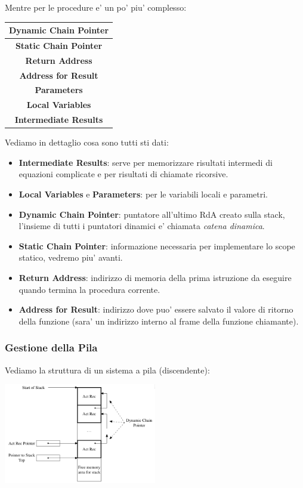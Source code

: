 Mentre per le procedure e' un po' piu' complesso:
\begin{center}
    \renewcommand{\arraystretch}{1.8} %
    \setlength{\tabcolsep}{2em} %
    
    \begin{tabular}{|c|}
        \hline
        \textbf{Dynamic Chain Pointer} \\ \hline
        \textbf{Static Chain Pointer} \\ \hline
        \textbf{Return Address} \\ \hline
        \textbf{Address for Result} \\ \hline
        \textbf{Parameters} \\ \hline
        \textbf{Local Variables} \\ \hline
        \textbf{Intermediate Results} \\ \hline
    \end{tabular}
\end{center}

Vediamo in dettaglio cosa sono tutti sti dati:
\begin{itemize}
\item \textbf{Intermediate Results}: serve per memorizzare risultati intermedi di equazioni complicate e per risultati di chiamate ricorsive.
\item \textbf{Local Variables} e \textbf{Parameters}: per le variabili locali e parametri.
\item \textbf{Dynamic Chain Pointer}: puntatore all'ultimo RdA creato sulla stack, l'insieme di tutti i puntatori dinamici e' chiamata \textit{catena dinamica}.
\item \textbf{Static Chain Pointer}: informazione necessaria per implementare lo scope statico, vedremo piu' avanti.
\item \textbf{Return Address}: indirizzo di memoria della prima istruzione da eseguire quando termina la procedura corrente.
\item \textbf{Address for Result}: indirizzo dove puo' essere salvato il valore di ritorno della funzione (sara' un indirizzo interno al frame della funzione chiamante).
\end{itemize}

\subsubsection{Gestione della Pila}

Vediamo la struttura di un sistema a pila (discendente):
\begin{center}
  \includegraphics[width=0.5\textwidth]{img/2025-03-02-12-39-06.png}
\end{center}

